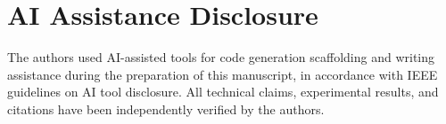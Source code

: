 \documentclass[conference]{IEEEtran}
\begin{document}
\section*{AI Assistance Disclosure}

The authors used AI-assisted tools for code generation scaffolding and writing assistance during the preparation of this manuscript, in accordance with IEEE guidelines on AI tool disclosure. All technical claims, experimental results, and citations have been independently verified by the authors.


\end{document}
